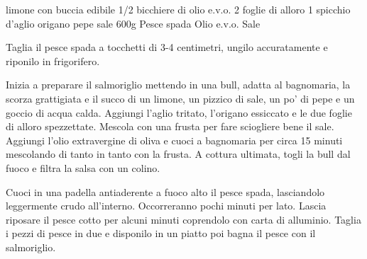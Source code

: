 
\begin{ingreds}
	 limone con buccia edibile
	1/2 bicchiere di olio e.v.o.
	2 foglie di alloro
	1 spicchio d'aglio
	origano
	pepe
	sale
\columnbreak
     	600g Pesce spada
     	Olio e.v.o.
	Sale
\end{ingreds}

\begin{method}
Taglia il pesce spada a tocchetti di 3-4 centimetri, ungilo accuratamente e riponilo in frigorifero.

Inizia a preparare il salmoriglio mettendo in una bull, adatta al bagnomaria, la scorza grattigiata e il succo di un limone, un pizzico di sale, un po' di pepe e un goccio di acqua calda. Aggiungi l'aglio tritato, l'origano essiccato e le due foglie di alloro spezzettate. Mescola con una frusta per fare sciogliere bene il sale. Aggiungi l'olio extravergine di oliva e cuoci a bagnomaria per circa 15 minuti mescolando di tanto in tanto con la frusta. A cottura ultimata, togli la bull dal fuoco e filtra la salsa con un colino.

Cuoci in una padella antiaderente a fuoco alto il pesce spada, lasciandolo leggermente crudo all'interno. Occorreranno pochi minuti per lato. Lascia riposare il pesce cotto per alcuni minuti coprendolo con carta di alluminio. Taglia i pezzi di pesce in due e disponilo in un piatto poi bagna il pesce con il salmoriglio.

\end {method}



